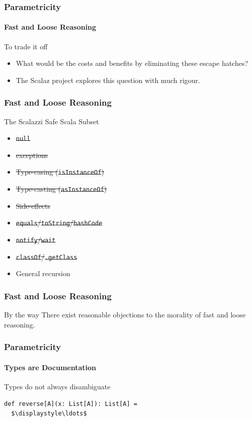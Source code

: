 \begin{frame}
\frametitle{Parametricity}
\framesubtitle{Fast and Loose Reasoning}
\begin{block}{To trade it off}
\begin{itemize}
  \item<1-> What would be the costs and benefits by eliminating these escape hatches?
  \item<2-> The Scalaz project explores this question with much rigour.
\end{itemize}
\end{block}
\end{frame}


\begin{frame}[fragile]
\frametitle{Fast and Loose Reasoning}
\begin{block}{The Scalazzi Safe Scala Subset}
\begin{itemize}
  \item \sout{\lstinline{null}}
  \item \sout{exceptions}
  \item \sout{Type-casing (\lstinline{isInstanceOf})}
  \item \sout{Type-casting (\lstinline{asInstanceOf})}
  \item \sout{Side-effects}
  \item \sout{\lstinline{equals}/\lstinline{toString}/\lstinline{hashCode}}
  \item \sout{\lstinline{notify}/\lstinline{wait}}
  \item \sout{\lstinline{classOf}/\lstinline{.getClass}}
  \item General recursion
\end{itemize}
\end{block}
\end{frame}


\begin{frame}[fragile]
\frametitle{Fast and Loose Reasoning}
\begin{block}{By the way}
There exist reasonable objections to the morality of fast and loose reasoning.
\end{block}
\end{frame}


\begin{frame}[fragile]
\frametitle{Parametricity}
\framesubtitle{Types are Documentation}
\begin{block}{Types do not always disambiguate}
\begin{lstlisting}[style=scala,mathescape]
def reverse[A](x: List[A]): List[A] =
  $\displaystyle\ldots$
\end{lstlisting}
\end{block}
\end{frame}


